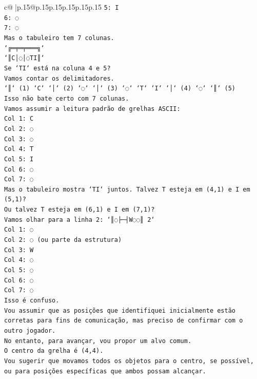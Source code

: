 \documentclass{article}
\begin{document}
{\begin{supertabular}{c@{$\;$}|p{.15\linewidth}@{}p{.15\linewidth}p{.15\linewidth}p{.15\linewidth}p{.15\linewidth}p{.15\linewidth}}
{{{\texttt{5: I} \\
\texttt{6: ◌} \\
\texttt{7: ◌} \\
\texttt{Mas o tabuleiro tem 7 colunas.} \\
\texttt{`╔═╤═╤═══╗`} \\
\texttt{`║C│◌│◌TI║`} \\
\texttt{Se `TI` está na coluna 4 e 5?} \\
\texttt{Vamos contar os delimitadores.} \\
\texttt{`║` (1) `C` `│` (2) `◌` `│` (3) `◌` `T` `I` `│` (4) `◌` `║` (5)} \\
\texttt{Isso não bate certo com 7 colunas.} \\
\texttt{Vamos assumir a leitura padrão de grelhas ASCII:} \\
\texttt{Col 1: C} \\
\texttt{Col 2: ◌} \\
\texttt{Col 3: ◌} \\
\texttt{Col 4: T} \\
\texttt{Col 5: I} \\
\texttt{Col 6: ◌} \\
\texttt{Col 7: ◌} \\
\texttt{Mas o tabuleiro mostra `TI` juntos. Talvez T esteja em (4,1) e I em (5,1)?} \\
\texttt{Ou talvez T esteja em (6,1) e I em (7,1)?} \\
\texttt{Vamos olhar para a linha 2: `║◌├─┤W◌◌║ 2`} \\
\texttt{Col 1: ◌} \\
\texttt{Col 2: ◌ (ou parte da estrutura)} \\
\texttt{Col 3: W} \\
\texttt{Col 4: ◌} \\
\texttt{Col 5: ◌} \\
\texttt{Col 6: ◌} \\
\texttt{Col 7: ◌} \\
\texttt{Isso é confuso.} \\
\texttt{Vou assumir que as posições que identifiquei inicialmente estão corretas para fins de comunicação, mas preciso de confirmar com o outro jogador.} \\
\texttt{No entanto, para avançar, vou propor um alvo comum.} \\
\texttt{O centro da grelha é (4,4).} \\
\texttt{Vou sugerir que movamos todos os objetos para o centro, se possível, ou para posições específicas que ambos possam alcançar.} \\
}}}
\end{supertabular}}
\end{document}
